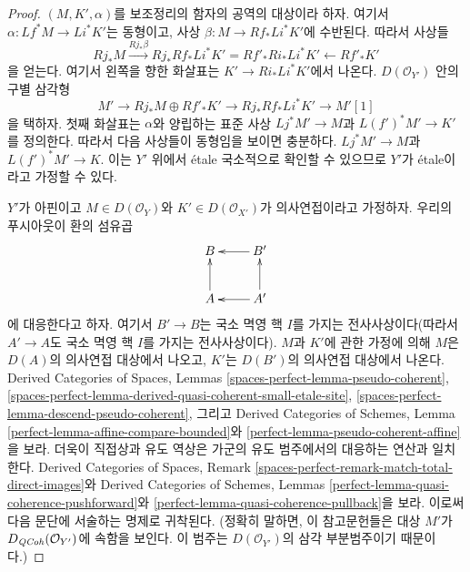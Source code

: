 \begin{proof}
$(M, K', \alpha)$를 보조정리의 함자의 공역의 대상이라 하자.
여기서 $\alpha : Lf^*M \to Li^*K'$는 동형이고,
사상 $\beta : M \to Rf_*Li^*K'$에 수반된다. 따라서 사상들
$$
Rj_*M \xrightarrow{Rj_*\beta}
Rj_*Rf_*Li^*K' = Rf'_*Ri_*Li^*K' \leftarrow Rf'_*K'
$$
을 얻는다. 여기서 왼쪽을 향한 화살표는
$K' \to Ri_*Li^*K'$에서 나온다. $D(\mathcal{O}_{Y'})$ 안의
구별 삼각형
$$
M' \to Rj_*M \oplus Rf'_*K' \to Rj_*Rf_*Li^*K' \to M'[1]
$$
을 택하자. 첫째 화살표는 $\alpha$와 양립하는 표준 사상
$Lj^*M' \to M$과 $L(f')^*M' \to K'$를 정의한다.
따라서 다음 사상들이 동형임을 보이면 충분하다.
$Lj^*M' \to M$과 $L(f')^*M' \to K$.
이는 $Y'$ 위에서 \'etale 국소적으로 확인할 수 있으므로
$Y'$가 \'etale이라고 가정할 수 있다.

\medskip\noindent
$Y'$가 아핀이고 $M \in D(\mathcal{O}_Y)$와
$K' \in D(\mathcal{O}_{X'})$가 의사연접이라고 가정하자.
우리의 푸시아웃이 환의 섬유곱
$$
\xymatrix{
B & B' \ar[l] \\
A \ar[u] & A' \ar[l] \ar[u]
}
$$
에 대응한다고 하자. 여기서 $B' \to B$는 국소 멱영 핵 $I$를 가지는
전사사상이다(따라서 $A' \to A$도 국소 멱영 핵 $I$를 가지는 전사사상이다).
$M$과 $K'$에 관한 가정에 의해 $M$은 $D(A)$의 의사연접 대상에서 나오고,
$K'$는 $D(B')$의 의사연접 대상에서 나온다. Derived Categories of Spaces,
Lemmas \ref{spaces-perfect-lemma-pseudo-coherent},
\ref{spaces-perfect-lemma-derived-quasi-coherent-small-etale-site},
\ref{spaces-perfect-lemma-descend-pseudo-coherent}, 그리고
Derived Categories of Schemes, Lemma
\ref{perfect-lemma-affine-compare-bounded}와
\ref{perfect-lemma-pseudo-coherent-affine}을 보라.
더욱이 직접상과 유도 역상은 가군의 유도 범주에서의 대응하는 연산과
일치한다. Derived Categories of Spaces, Remark
\ref{spaces-perfect-remark-match-total-direct-images}와
Derived Categories of Schemes, Lemmas
\ref{perfect-lemma-quasi-coherence-pushforward}와
\ref{perfect-lemma-quasi-coherence-pullback}을 보라.
이로써 다음 문단에 서술하는 명제로 귀착된다.
(정확히 말하면, 이 참고문헌들은 대상 $M'$가
$D_{\mathit{QCoh}}(\mathcal{O}_{Y'})$에 속함을 보인다. 이 범주는
$D(\mathcal{O}_{Y'})$의 삼각 부분범주이기 때문이다.)


\end{proof}
